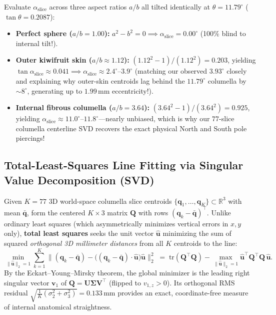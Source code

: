 \documentclass[10pt,a4paper]{article}
\renewcommand{\_}{\origunderscore\allowbreak}
\begin{document}
\begin{tcolorbox}[enhanced, colback=lightgray, colframe=kiwigreen!80!black, arc=2pt, left=7pt, right=7pt, top=5pt, bottom=5pt,
  title={\textbf{Worked Numerical Verification of Equation~\eqref{eq:ellipsoid_proof} at True Tilt $\theta = 11.79^\circ$}}]
Evaluate $\alpha_{\text{slice}}$ across three aspect ratios $a/b$ all tilted identically at $\theta = 11.79^\circ$ ($\tan\theta = 0.2087$):
\begin{itemize}[itemsep=1.2pt, topsep=2pt]
    \item \textbf{Perfect sphere ($a/b = 1.00$):} $a^2 - b^2 = 0 \implies \alpha_{\text{slice}} = \mathbf{0.00^\circ}$ (100\% blind to internal tilt!).
    \item \textbf{Outer kiwifruit skin ($a/b \approx 1.12$):} $(1.12^2 - 1)/(1.12^2) = 0.203$, yielding $\tan\alpha_{\text{slice}} \approx 0.041 \implies \alpha_{\text{slice}} \approx \mathbf{2.4^\circ\text{--}3.9^\circ}$ (matching our observed $3.93^\circ$ closely and explaining why outer-skin centroids lag behind the $11.79^\circ$ columella by $\sim 8^\circ$, generating up to $1.99\,\text{mm}$ eccentricity!).
    \item \textbf{Internal fibrous columella ($a/b = 3.64$):} $(3.64^2 - 1)/(3.64^2) = 0.925$, yielding $\alpha_{\text{slice}} \approx \mathbf{11.0^\circ\text{--}11.8^\circ}$---nearly unbiased, which is why our $77$-slice columella centerline SVD recovers the exact physical North and South pole piercings!
\end{itemize}
\end{tcolorbox}

\subsection{Total-Least-Squares Line Fitting via Singular Value Decomposition (SVD)}

Given $K = 77$ 3D world-space columella slice centroids $\{\mathbf{q}_1, \dots, \mathbf{q}_K\} \subset \mathbb{R}^3$ with mean $\bar{\mathbf{q}}$, form the centered $K \times 3$ matrix $\mathbf{Q}$ with rows $(\mathbf{q}_k - \bar{\mathbf{q}})^\top$. Unlike ordinary least squares (which asymmetrically minimizes vertical errors in $x, y$ only), \textbf{total least squares} seeks the unit vector $\hat{\mathbf{u}}$ minimizing the sum of squared \emph{orthogonal 3D millimeter distances} from all $K$ centroids to the line:
\begin{equation}
    \min_{\|\hat{\mathbf{u}}\|_2 = 1} \sum_{k=1}^K \bigl\|(\mathbf{q}_k - \bar{\mathbf{q}}) - \bigl((\mathbf{q}_k - \bar{\mathbf{q}})\cdot\hat{\mathbf{u}}\bigr)\hat{\mathbf{u}}\bigr\|_2^2
    \;=\; \text{tr}(\mathbf{Q}^\top\mathbf{Q}) - \max_{\|\hat{\mathbf{u}}\|_2 = 1} \hat{\mathbf{u}}^\top\mathbf{Q}^\top\mathbf{Q}\,\hat{\mathbf{u}}.
\end{equation}
By the Eckart--Young--Mirsky theorem, the global minimizer is the leading right singular vector $\mathbf{v}_1$ of $\mathbf{Q} = \mathbf{U}\boldsymbol{\Sigma}\mathbf{V}^\top$ (flipped to $v_{1,z} > 0$). Its orthogonal RMS residual $\sqrt{\frac{1}{K}(\sigma_2^2 + \sigma_3^2)} = 0.133\,\text{mm}$ provides an exact, coordinate-free measure of internal anatomical straightness.
\end{document}
